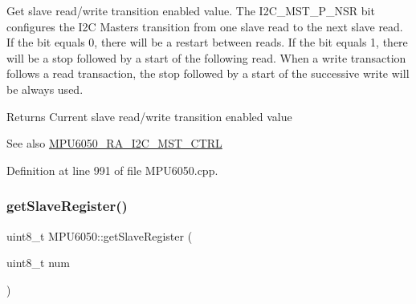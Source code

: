 Get slave read/write transition enabled value. The I2\+C\+\_\+\+M\+S\+T\+\_\+\+P\+\_\+\+N\+SR bit configures the I2C Master\textquotesingle{}s transition from one slave read to the next slave read. If the bit equals 0, there will be a restart between reads. If the bit equals 1, there will be a stop followed by a start of the following read. When a write transaction follows a read transaction, the stop followed by a start of the successive write will be always used.

\begin{DoxyReturn}{Returns}
Current slave read/write transition enabled value 
\end{DoxyReturn}
\begin{DoxySeeAlso}{See also}
\mbox{\hyperlink{MPU6050_8h_ae4804708dd5f21dbca1ff1815b883504}{M\+P\+U6050\+\_\+\+R\+A\+\_\+\+I2\+C\+\_\+\+M\+S\+T\+\_\+\+C\+T\+RL}} 
\end{DoxySeeAlso}


Definition at line 991 of file M\+P\+U6050.\+cpp.


\begin{DoxyCode}{0}

\end{DoxyCode}
\mbox{\label{classMPU6050_ae7e9ead9645bcef326eb579c6ab5d5ff}} 
\subsubsection{\texorpdfstring{getSlaveRegister()}{getSlaveRegister()}}
{\footnotesize\ttfamily uint8\+\_\+t M\+P\+U6050\+::get\+Slave\+Register (\begin{DoxyParamCaption}\item[{uint8\+\_\+t}]{num }\end{DoxyParamCaption})}

